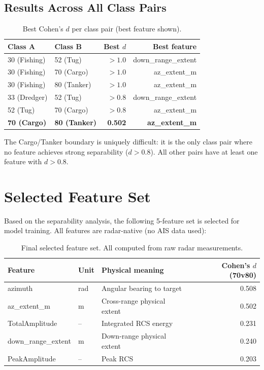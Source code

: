 \documentclass[journal]{IEEEtran}
\begin{document}
\subsection{Results Across All Class Pairs}

\begin{table}[H]
\centering
\caption{Best Cohen's $d$ per class pair (best feature shown).}
\begin{tabular}{llrr}
\toprule
\textbf{Class A} & \textbf{Class B} & \textbf{Best $d$} & \textbf{Best feature} \\
\midrule
30 (Fishing)   & 52 (Tug)         & $>1.0$ & down\_range\_extent \\
30 (Fishing)   & 70 (Cargo)       & $>1.0$ & az\_extent\_m \\
30 (Fishing)   & 80 (Tanker)      & $>1.0$ & az\_extent\_m \\
33 (Dredger)   & 52 (Tug)         & $>0.8$ & down\_range\_extent \\
52 (Tug)       & 70 (Cargo)       & $>0.8$ & az\_extent\_m \\
\textbf{70 (Cargo)} & \textbf{80 (Tanker)} & \textbf{0.502} & \textbf{az\_extent\_m} \\
\bottomrule
\end{tabular}
\end{table}

The Cargo/Tanker boundary is uniquely difficult: it is the only class pair where
no feature achieves strong separability ($d > 0.8$). All other pairs have at
least one feature with $d > 0.8$.

\section{Selected Feature Set}
\label{sec:selected}

Based on the separability analysis, the following 5-feature set is selected
for model training. All features are radar-native (no AIS data used):

\begin{table}[H]
\centering
\caption{Final selected feature set. All computed from raw radar measurements.}
\begin{tabular}{llp{6cm}r}
\toprule
\textbf{Feature} & \textbf{Unit} & \textbf{Physical meaning} & \textbf{Cohen's $d$ (70v80)} \\
\midrule
azimuth            & rad & Angular bearing to target         & 0.508 \\
az\_extent\_m      & m   & Cross-range physical extent       & 0.502 \\
TotalAmplitude     & --  & Integrated RCS energy             & 0.231 \\
down\_range\_extent & m  & Down-range physical extent        & 0.240 \\
PeakAmplitude      & --  & Peak RCS                         & 0.203 \\
\bottomrule
\end{tabular}
\end{table}
\end{document}
